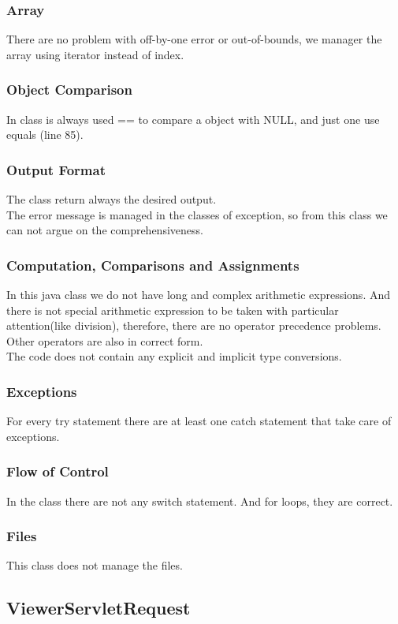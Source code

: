 \documentclass{article}
\begin{document}
\subsubsection{Array}
There are no problem with off-by-one error or out-of-bounds, we manager the array using iterator instead of index.
\subsubsection{Object Comparison}
In class is always used == to compare a object with NULL, and just one use equals (line 85).
\subsubsection{Output Format}
The class return always the desired output.\\
The error message is managed in the classes of exception, so from this class we can not argue on the comprehensiveness.
\subsubsection{Computation, Comparisons and Assignments}
In this java class we do not have long and complex arithmetic expressions. And there is not special arithmetic expression to be taken with particular attention(like division), therefore, there are no operator precedence problems.\\
Other operators are also in correct form.\\
The code does not contain any explicit and implicit type conversions.
\subsubsection{Exceptions}
For every try statement there are at least one catch statement that take care of exceptions.
\subsubsection{Flow of Control}
In the class there are not any switch statement. And for loops,  they are correct.
\subsubsection{Files}
This class does not manage the files.

\newpage
 \subsection{ViewerServletRequest}
\end{document}
